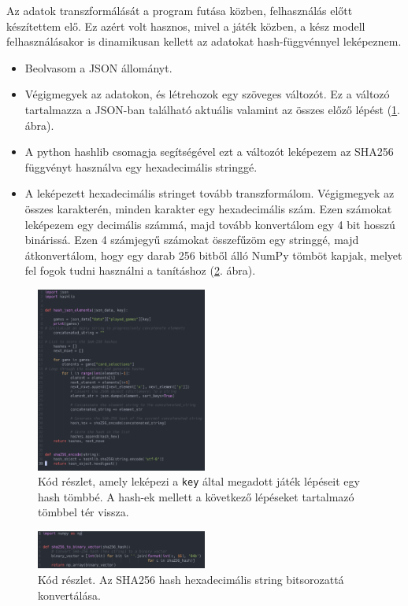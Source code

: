 Az adatok transzformálását a program futása közben, felhasználás előtt készítettem elő. Ez azért volt hasznos, mivel a játék közben, a kész modell felhasználásakor is dinamikusan kellett az adatokat hash-függvénnyel leképeznem.

\begin{itemize}
    \item Beolvasom a JSON állományt. 
    \item Végigmegyek az adatokon, és létrehozok egy szöveges változót. Ez a változó tartalmazza a JSON-ban található aktuális valamint az összes előző lépést  (\ref{code:json_to_hash}. ábra). 
    \item A python hashlib csomagja segítségével ezt a változót leképezem az SHA256 függvényt használva egy hexadecimális stringgé. 
    \item A leképezett hexadecimális stringet tovább transzformálom. 
    Végigmegyek az összes karakterén, minden karakter egy hexadecimális szám. Ezen számokat leképezem egy decimális számmá, majd tovább konvertálom egy 4 bit hosszú binárissá. Ezen 4 számjegyű számokat összefűzöm egy stringgé, majd átkonvertálom, hogy egy darab 256 bitből álló NumPy tömböt kapjak, melyet fel fogok tudni használni a tanításhoz (\ref{code:hash_to_bit}. ábra). 
\end{itemize}

\begin{figure}[h]
    \center
    \includegraphics[width=0.50\textwidth]{img/JSON_TO_SHA256.png}
    \caption{Kód részlet, amely leképezi a \lstinline{key} által megadott játék lépéseit egy hash tömbbé. A hash-ek mellett a következő lépéseket tartalmazó tömbbel tér vissza.}
    \label{code:json_to_hash}
\end{figure}

\begin{figure}[h]
    \center
    \includegraphics[width=0.50\textwidth]{img/hash_to_bit.png}
    \caption{Kód részlet. Az SHA256 hash hexadecimális string bitsorozattá konvertálása.}
    \label{code:hash_to_bit}
\end{figure}

